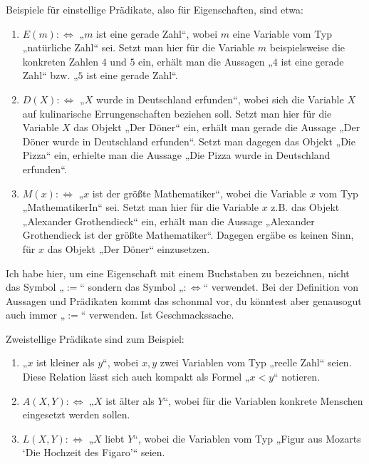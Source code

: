 \begin{bsp}
    Beispiele für einstellige Prädikate, also für Eigenschaften, sind etwa:
    \begin{enumerate}
        \item $E(m):\Leftrightarrow$ „$m$ ist eine gerade Zahl“, wobei $m$ eine Variable vom Typ „natürliche Zahl“ sei. Setzt man hier für die Variable $m$ beispielsweise die konkreten Zahlen $4$ und $5$ ein, erhält man die Aussagen „$4$ ist eine gerade Zahl“ bzw. „$5$ ist eine gerade Zahl“.
        \item $D(X):\Leftrightarrow$ „$X$ wurde in Deutschland erfunden“, wobei sich die Variable $X$ auf kulinarische Errungenschaften beziehen soll. Setzt man hier für die Variable $X$ das Objekt „Der Döner“ ein, erhält man gerade die Aussage „Der Döner wurde in Deutschland erfunden“. Setzt man dagegen das Objekt „Die Pizza“ ein, erhielte man die Aussage „Die Pizza wurde in Deutschland erfunden“.
        \item $M(x):\Leftrightarrow $ „$x$ ist der größte Mathematiker“, wobei die Variable $x$ vom Typ „MathematikerIn“ sei. Setzt man hier für die Variable $x$ z.B. das Objekt „Alexander Grothendieck“ ein, erhält man die Aussage „Alexander Grothendieck ist der größte Mathematiker“. Dagegen ergäbe es keinen Sinn, für $x$ das Objekt „Der Döner“ einzusetzen.
    \end{enumerate}
    Ich habe hier, um eine Eigenschaft mit einem Buchstaben zu bezeichnen, nicht das Symbol „$:=$“ sondern das Symbol „$:\Leftrightarrow$“ verwendet. Bei der Definition von Aussagen und Prädikaten kommt das schonmal vor, du könntest aber genausogut auch immer „$:=$“ verwenden. Ist Geschmackssache.
\end{bsp}


\begin{bsp}
    Zweistellige Prädikate sind zum Beispiel:
    \begin{enumerate}
        \item „$x$ ist kleiner als $y$“, wobei $x,y$ zwei Variablen vom Typ „reelle Zahl“ seien. Diese Relation lässt sich auch kompakt als Formel „$x<y$“ notieren.
        \item $A(X,Y):\Leftrightarrow$ „$X$ ist älter als $Y$“, wobei für die Variablen konkrete Menschen eingesetzt werden sollen.
        \item $L(X,Y):\Leftrightarrow$ „$X$ liebt $Y$“, wobei die Variablen vom Typ „Figur aus Mozarts `Die Hochzeit des Figaro'“ seien.
    \end{enumerate}
\end{bsp}






